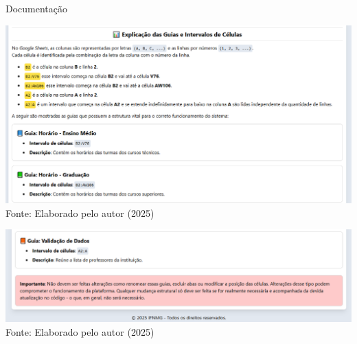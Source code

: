 \begin{frame}{Documentação}
    \begin{minipage}{0.48\textwidth}
        \centering
        \includegraphics[width=1\textwidth]{figuras/doc-3.png}
        \footnotesize Fonte: Elaborado pelo autor (2025)
    \end{minipage}
    \hfill
    \begin{minipage}{0.48\textwidth}
        \centering
        \includegraphics[width=1\textwidth]{figuras/doc-4.png}
        \footnotesize Fonte: Elaborado pelo autor (2025)
    \end{minipage}
\end{frame}